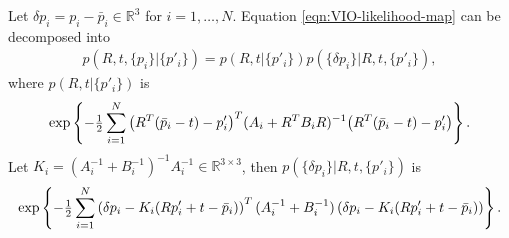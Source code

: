 \begin{lemma} \label{lemma:VIO-likelihood-map-factor}
	Let $\delta p_i = p_i-\bar{p}_i \in \mathbb{R}^3$ for $i=1,\dots,N$. Equation \eqref{eqn:VIO-likelihood-map} can be decomposed into
	\begin{align}
		p(R,t,\{p_i\}|\{p'_i\}) = p(R,t|\{p'_i\}) p(\{\delta p_i\}|R,t,\{p'_i\}),
	\end{align}
	where $p(R,t|\{p'_i\})$ is
	\begin{align} \label{eqn:VIO-likelihood-map-Rt}
		\exp\left\{ -\tfrac{1}{2} \sum_{i=1}^N \big(R^T(\bar{p}_i-t)-p'_i\big)^T (A_i+R^TB_iR)^{-1} \big(R^T(\bar{p}_i-t)-p'_i\big) \right\}.
	\end{align}
	Let $K_i = (A_i^{-1}+B_i^{-1})^{-1} A_i^{-1} \in \mathbb{R}^{3\times 3}$, then $p(\{\delta p_i\}|R,t,\{p'_i\})$ is
	\begin{align} \label{eqn:VIO-likelihood-map-p}
		\exp\left\{ -\tfrac{1}{2} \sum_{i=1}^N \left( \delta p_i - K_i(Rp'_i+t-\bar{p}_i) \right)^T (A_i^{-1}+B_i^{-1}) \left( \delta p_i - K_i(Rp'_i+t-\bar{p}_i) \right) \right\}.
	\end{align}
\end{lemma}
